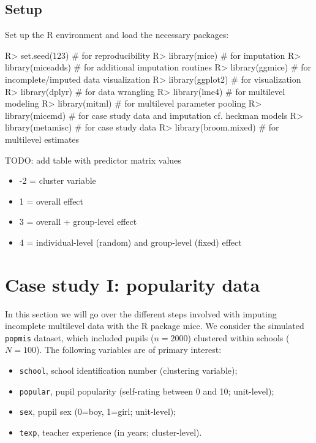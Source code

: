 \documentclass[
]{jss}
\providecommand{\tightlist}{%
  \setlength{\itemsep}{0pt}\setlength{\parskip}{0pt}}
\begin{document}
\hypertarget{setup}{%
\subsection{Setup}\label{setup}}

Set up the R environment and load the necessary packages:

\begin{CodeChunk}
\begin{CodeInput}
R> set.seed(123)         # for reproducibility
R> library(mice)         # for imputation
R> library(miceadds)     # for additional imputation routines
R> library(ggmice)       # for incomplete/imputed data visualization
R> library(ggplot2)      # for visualization
R> library(dplyr)        # for data wrangling
R> library(lme4)         # for multilevel modeling
R> library(mitml)        # for multilevel parameter pooling
R> library(micemd)       # for case study data and imputation cf. heckman models
R> library(metamisc)     # for case study data
R> library(broom.mixed)  # for multilevel estimates
\end{CodeInput}
\end{CodeChunk}

TODO: add table with predictor matrix values

\begin{itemize}
\tightlist
\item
  -2 = cluster variable
\item
  1 = overall effect
\item
  3 = overall + group-level effect
\item
  4 = individual-level (random) and group-level (fixed) effect
\end{itemize}

\hypertarget{case-study-i-popularity-data}{%
\section{Case study I: popularity
data}\label{case-study-i-popularity-data}}

In this section we will go over the different steps involved with
imputing incomplete multilevel data with the R package mice. We consider
the simulated \texttt{popmis} dataset, which included pupils
(\(n = 2000\)) clustered within schools (\(N = 100\)). The following
variables are of primary interest:

\begin{itemize}
\tightlist
\item
  \texttt{school}, school identification number (clustering variable);
\item
  \texttt{popular}, pupil popularity (self-rating between 0 and 10;
  unit-level);
\item
  \texttt{sex}, pupil sex (0=boy, 1=girl; unit-level);
\item
  \texttt{texp}, teacher experience (in years; cluster-level).
\end{itemize}
\end{document}
